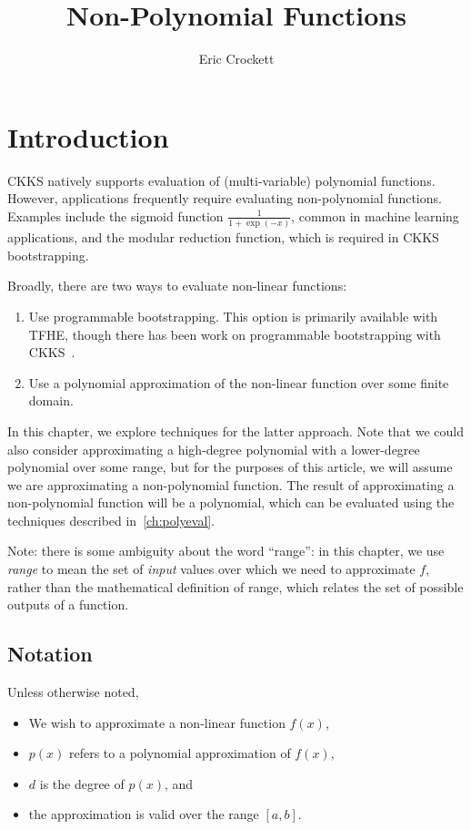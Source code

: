 \documentclass[../fheimpl.tex]{subfiles}
\title{Non-Polynomial Functions}
\author{Eric Crockett}
\begin{document}
    \ifcompileasbook
    \else
    \maketitle
    \listoffixmes
    \fi
    \label{ch:polyapprox}
    
    \section{Introduction}
    CKKS natively supports evaluation of (multi-variable) polynomial functions. However, applications frequently require evaluating non-polynomial functions. Examples include the sigmoid function $\frac{1}{1+\exp(-x)}$, common in machine learning applications, and the modular reduction function, which is required in CKKS bootstrapping.
    
    Broadly, there are two ways to evaluate non-linear functions:
    \begin{enumerate}
        \item Use programmable bootstrapping. This option is primarily available with TFHE, though there has been work on programmable bootstrapping with CKKS~\cite{cryptoeprint:2024/1623}.
        
        \item Use a polynomial approximation of the non-linear function over some finite domain.
    \end{enumerate}
    
    In this chapter, we explore techniques for the latter approach. Note that we could also consider approximating a high-degree polynomial with a lower-degree polynomial over some range, but for the purposes of this article, we will assume we are approximating a non-polynomial function. The result of approximating a non-polynomial function will be a polynomial, which can be evaluated using the techniques described in~\cref{ch:polyeval}.
        
    Note: there is some ambiguity about the word ``range'': in this chapter, we use \emph{range} to mean the set of \emph{input} values over which we need to approximate $f$, rather than the mathematical definition of range, which relates the set of possible outputs of a function. 
    
    \subsection{Notation}
    Unless otherwise noted, 
    \begin{itemize}
        \item We wish to approximate a non-linear function $f(x)$,
        \item $p(x)$ refers to a polynomial approximation of $f(x)$,
        \item $d$ is the degree of $p(x)$, and
        \item the approximation is valid over the range $[a,b]$.
    \end{itemize}
    
\end{document}
